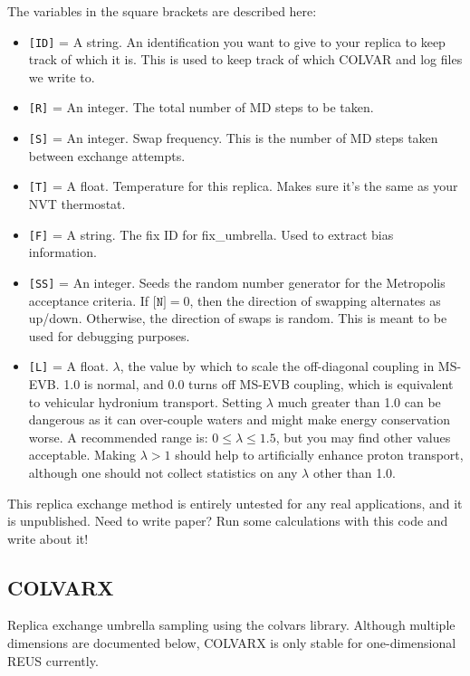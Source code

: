 \documentclass[10pt]{article}
\begin{document}
The variables in the square brackets are described here:
\begin{itemize}
\item	\texttt{[ID]} = A string. An identification you want to give to your replica to keep track of which it is.
		This is used to keep track of which COLVAR and log files we write to.
\item	\texttt{[R]} = An integer. The total number of MD steps to be taken.
\item	\texttt{[S]} = An integer. Swap frequency. This is the number of MD steps taken between exchange attempts.
\item	\texttt{[T]} = A float. Temperature for this replica. Makes sure it's the same as your NVT thermostat.
\item	\texttt{[F]} = A string. The fix ID for fix\_umbrella. Used to extract bias information.
\item	\texttt{[SS]} = An integer. Seeds the random number generator for the Metropolis
		acceptance criteria.
		If $\texttt{[N]} = 0$,
		then the direction of swapping alternates as up/down. Otherwise, the direction of swaps
		is random. This is meant to be used for debugging purposes.
\item	\texttt{[L]} = A float. $\lambda$, the value by which to scale the off-diagonal coupling in MS-EVB. 1.0 is normal,
		and 0.0 turns off MS-EVB coupling, which is equivalent to vehicular hydronium transport. Setting $\lambda$ much
		greater than 1.0 can be dangerous as it can over-couple waters and might make energy conservation worse. A recommended
		range is: $0 \le \lambda \le 1.5$, but you may find other values acceptable. Making $\lambda > 1$ should help
		to artificially enhance proton transport, although one should not collect statistics on any $\lambda$ other than 1.0.
\end{itemize}

This replica exchange method is entirely untested for any real applications, and it is unpublished. Need to write paper? Run
some calculations with this code and write about it!


\subsection{COLVARX}

Replica exchange umbrella sampling using the colvars library. Although multiple dimensions are documented below,
COLVARX is only stable for one-dimensional REUS currently.
\end{document}
